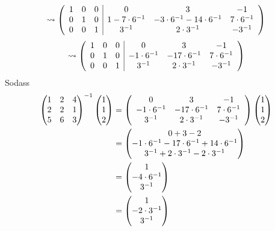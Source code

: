 \documentclass[sectionformat = aufgabe]{gadsescript}
\begin{document}
\[
	\rightsquigarrow
	\left(
		\begin{array}{c c c | c c c}
			1 & 0 & 0 & 0			&  3				& -1 \\
			0 & 1 & 0 & 1 - 7 \cdot 6^{-1}	&  -3 \cdot 6^{-1} - 14 \cdot 6^{-1}	& 7 \cdot 6^{-1}  \\
			0 & 0 & 1 & 3^{-1} 		& 2 \cdot 3^{-1}		& -3^{-1}  \\
		\end{array}
	\right)
\]
\[
	\rightsquigarrow
	\left(
		\begin{array}{c c c | c c c}
			1 & 0 & 0 &  0			&  3			& -1 \\
			0 & 1 & 0 & -1 \cdot 6^{-1}	&  - 17 \cdot 6^{-1}	& 7 \cdot 6^{-1}  \\
			0 & 0 & 1 &  3^{-1} 		& 2 \cdot 3^{-1}	& -3^{-1}  \\
		\end{array}
	\right)
\]
Sodass
\begin{align*}
	\begin{pmatrix}
		1 & 2 & 4 \\
		2 & 2 & 1 \\
		5 & 6 & 3 \\
	\end{pmatrix} ^{-1} 
	\begin{pmatrix} 1 \\ 1 \\ 2 \end{pmatrix} 
	&= 
	\left(
		\begin{array}{c c c}
			 0		&  3			& -1 \\
			-1 \cdot 6^{-1}	& - 17 \cdot 6^{-1}	& 7 \cdot 6^{-1}  \\
			 3^{-1} 	& 2 \cdot 3^{-1}	& -3^{-1}  \\
		\end{array}
	\right)
	\begin{pmatrix} 1 \\ 1 \\ 2 \end{pmatrix} \\
	~ &=
	\begin{pmatrix} 
		 0		+  3			  -2 \\
		-1 \cdot 6^{-1}	  - 17 \cdot 6^{-1}	+ 14 \cdot 6^{-1}  \\
		 3^{-1} 	+ 2 \cdot 3^{-1}	  -2 \cdot 3^{-1}  \\
	\end{pmatrix} \\
	~ &=
	\begin{pmatrix} 
		1 \\
		-4 \cdot 6^{-1} \\
		3^{-1} \\
	\end{pmatrix} \\
	~ &=
	\begin{pmatrix} 
		1 \\
		-2 \cdot 3^{-1} \\
		3^{-1} \\
	\end{pmatrix} \\
\end{align*}
\end{document}
